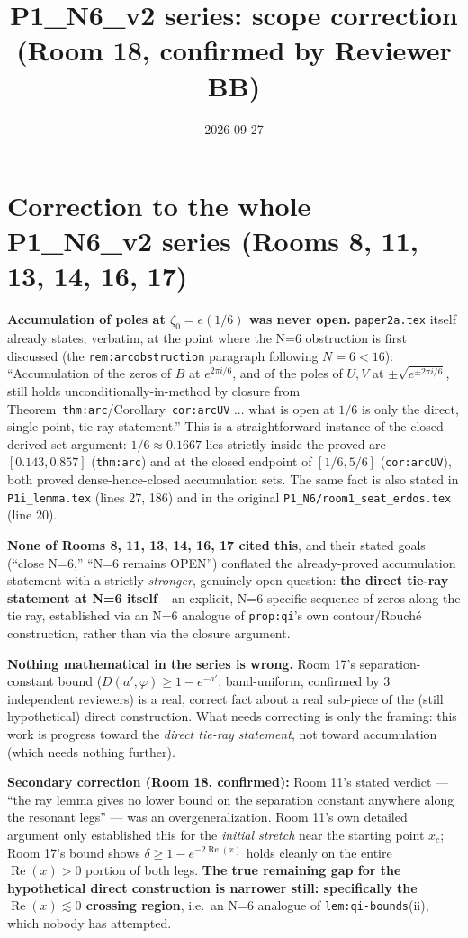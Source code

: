 \documentclass[11pt]{article}
\title{P1\_N6\_v2 series: scope correction (Room 18, confirmed by Reviewer BB)}
\date{2026-09-27}
\begin{document}
\maketitle

\section*{Correction to the whole P1\_N6\_v2 series (Rooms 8, 11, 13, 14, 16, 17)}

\textbf{Accumulation of poles at $\zeta_0=e(1/6)$ was never open.} \texttt{paper2a.tex} itself
already states, verbatim, at the point where the N=6 obstruction is first discussed (the
\texttt{rem:arcobstruction} paragraph following $N=6<16$): ``Accumulation of the zeros of $B$ at
$e^{2\pi i/6}$, and of the poles of $U,V$ at $\pm\sqrt{e^{\pm2\pi i/6}}$, still holds
unconditionally-in-method by closure from Theorem~\texttt{thm:arc}/Corollary~\texttt{cor:arcUV}
... what is open at $1/6$ is only the direct, single-point, tie-ray statement.'' This is a
straightforward instance of the closed-derived-set argument: $1/6\approx0.1667$ lies strictly
inside the proved arc $[0.143,0.857]$ (\texttt{thm:arc}) and at the closed endpoint of
$[1/6,5/6]$ (\texttt{cor:arcUV}), both proved dense-hence-closed accumulation sets. The same fact
is also stated in \texttt{P1i\_lemma.tex} (lines 27, 186) and in the original
\texttt{P1\_N6/room1\_seat\_erdos.tex} (line 20).

\textbf{None of Rooms 8, 11, 13, 14, 16, 17 cited this}, and their stated goals (``close N=6,''
``N=6 remains OPEN'') conflated the already-proved accumulation statement with a strictly
\emph{stronger}, genuinely open question: \textbf{the direct tie-ray statement at N=6 itself} --
an explicit, N=6-specific sequence of zeros along the tie ray, established via an N=6 analogue of
\texttt{prop:qi}'s own contour/Rouch\'e construction, rather than via the closure argument.

\textbf{Nothing mathematical in the series is wrong.} Room 17's separation-constant bound
($D(a',\varphi)\ge1-e^{-a'}$, band-uniform, confirmed by 3 independent reviewers) is a real,
correct fact about a real sub-piece of the (still hypothetical) direct construction. What needs
correcting is only the framing: this work is progress toward the \emph{direct tie-ray statement},
not toward accumulation (which needs nothing further).

\textbf{Secondary correction (Room 18, confirmed):} Room 11's stated verdict --- ``the ray lemma
gives no lower bound on the separation constant anywhere along the resonant legs'' --- was an
overgeneralization. Room 11's own detailed argument only established this for the \emph{initial
stretch} near the starting point $x_c$; Room 17's bound shows $\delta\ge1-e^{-2\operatorname{Re}(x)}$
holds cleanly on the entire $\operatorname{Re}(x)>0$ portion of both legs. \textbf{The true
remaining gap for the hypothetical direct construction is narrower still: specifically the
$\operatorname{Re}(x)\lesssim0$ crossing region}, i.e.\ an N=6 analogue of
\texttt{lem:qi-bounds}(ii), which nobody has attempted.
\end{document}
